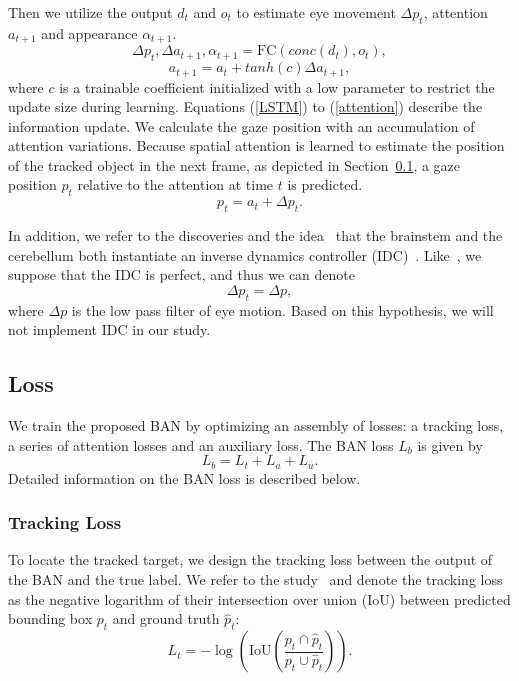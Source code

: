 \documentclass[journal]{IEEEtran}
\begin{document}
Then we utilize the output $d_t$ and $o_t$ to estimate eye movement $\Delta p_t$, attention $a_{t+1}$ and appearance $\alpha_{t+1}$.
\begin{equation} \label{FC}
	\Delta p_t, \Delta a_{t+1}, \alpha_{t+1} = \text{FC}(conc(d_t), o_t),
\end{equation}
\begin{equation} \label{attention}
	a_{t+1} = a_t + tanh(c) \Delta a_{t+1},
\end{equation}
where $c$ is a trainable coefficient initialized with a low parameter to restrict the update size during learning. 
Equations (\ref{LSTM}) to (\ref{attention}) describe the information update. 
We calculate the gaze position with an accumulation of attention variations. 
Because spatial attention is learned to estimate the position of the tracked object in the next frame, as depicted in Section~\ref{sec:loss}, a gaze position $p_t$ relative to the attention at time $t$ is predicted.
\begin{equation}
	p_t = a_t + \Delta p_t.
\end{equation}

In addition, we refer to the discoveries and the idea~\cite{b9} that the brainstem and the cerebellum both instantiate an inverse dynamics controller (IDC)~\cite{purkinje_IDC}. 
Like~\cite{b9}, we suppose that the IDC is perfect, and thus we can denote 
\begin{equation}
	\Delta p_t = \Delta p,
\end{equation}
where $\Delta p$ is the low pass filter of eye motion.
Based on this hypothesis, we will not implement IDC in our study. 

\subsection{Loss} \label{sec:loss}

We train the proposed BAN by optimizing an assembly of losses: a tracking loss, a series of attention losses and an auxiliary loss. 
The BAN loss $L_{b}$ is given by
\begin{equation}
	L_{b} = L_t + L_a + L_u.
\end{equation}
Detailed information on the BAN loss is described below.


\subsubsection{Tracking Loss}
To locate the tracked target, we design the tracking loss between the output of the BAN and the true label. 
We refer to the study~\cite{UnitBox} and denote the tracking loss as the negative logarithm of their intersection over union (IoU) between predicted bounding box $p_t$ and ground truth $\hat{p}_t$:
\begin{equation}
	L_t = -\log(\mbox{IoU} ( \frac{p_t \cap \hat{p}_t}{p_t \cup \hat{p}_t} )).
\end{equation}
\end{document}
